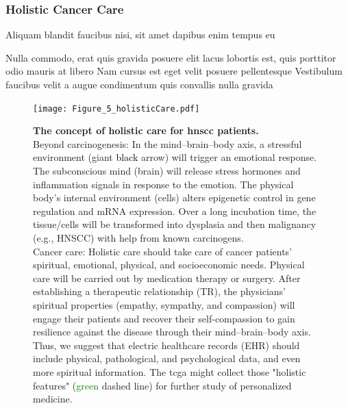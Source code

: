 \documentclass[
paper=landscape,
paper=160mm:90mm, %
fontsize=11pt, %
pagesize, %
parskip=half-, %
]{scrartcl} %
\newcommand{\bcaption}[2]{\caption{\textbf{#1} #2}}
\theoremstyle{mythmstyle} %
\begin{document}
\clearpage

\subsubsection{Holistic Cancer Care} 


\begin{outline}

\1 Aliquam blandit faucibus nisi, sit amet dapibus enim tempus eu

\2 Nulla commodo, erat quis gravida posuere
\1 elit lacus lobortis est, quis porttitor odio mauris at libero
\1 Nam cursus est eget velit posuere pellentesque
\1 Vestibulum faucibus velit a augue condimentum quis convallis nulla gravida

\end{outline}


\clearpage


\begin{figure}[hbt!]
\centering
\texttt{[image: Figure\_5\_holisticCare.pdf]}
\bcaption{The concept of holistic care for \acrshort{hnscc} patients.}
{\\Beyond carcinogenesis: In the mind--brain--body axis, a stressful environment (giant \textcolor{black}{black} arrow) will trigger an emotional response. The subconscious mind (brain) will release stress hormones and inflammation signals in response to the emotion. The physical body's internal environment (cells) alters epigenetic control in gene regulation and mRNA expression. Over a long incubation time, the tissue/cells will be transformed into dysplasia and then malignancy (e.g., HNSCC) with help from known carcinogens.\\
Cancer care: Holistic care should take care of cancer patients' spiritual, emotional, physical, and socioeconomic needs. Physical care will be carried out by medication therapy or surgery. After establishing a therapeutic relationship (TR), the physicians' spiritual properties (empathy, sympathy, and compassion) will engage their patients and recover their self-compassion to gain resilience against the disease through their mind--brain--body axis.
Thus, we suggest that electric healthcare records (EHR) should include physical, pathological, and psychological data, and even more spiritual information. The \acrshort{tcga} might collect those "holistic features"  (\textcolor{green}{green} dashed line) for further study of personalized medicine.}
\end{figure}

\clearpage
\end{document}
